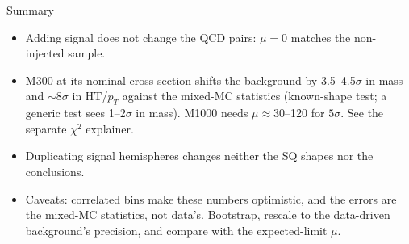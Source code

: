 \documentclass[aspectratio=169,11pt]{beamer}
\begin{document}
\begin{frame}{Summary}
  \begin{itemize}
    \item Adding signal does not change the QCD pairs: $\mu = 0$ matches the
          non-injected sample.
    \item M300 at its nominal cross section shifts the background by
          3.5--4.5$\sigma$ in mass and $\sim$8$\sigma$ in HT/$p_T$ against the mixed-MC
          statistics (known-shape test; a generic test sees 1--2$\sigma$ in mass).
          M1000 needs $\mu \approx 30$--120 for $5\sigma$.
          See the separate $\chi^2$ explainer.
    \item Duplicating signal hemispheres changes neither the SQ shapes nor the
          conclusions.
    \item Caveats: correlated bins make these numbers optimistic, and the errors are
          the mixed-MC statistics, not data's. Bootstrap, rescale to the data-driven
          background's precision, and compare with the expected-limit $\mu$.
  \end{itemize}
\end{frame}
\end{document}
